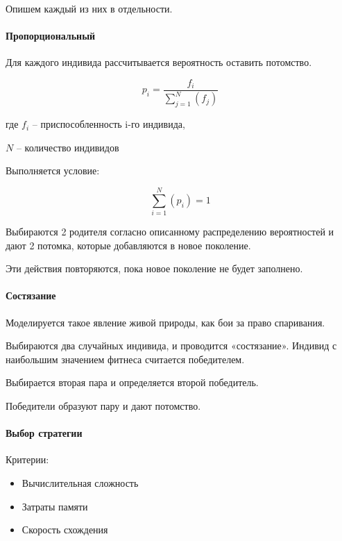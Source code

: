 Опишем каждый из них в отдельности.

\paragraph{Пропорциональный} \label{par:prop}

Для каждого индивида рассчитывается вероятность оставить потомство.

\begin{equation}
\label{equation:propF1}
p_i = \frac{f_i}{\sum_{j=1}^N(f_j)}
\end{equation}
\begin{ESKDexplanation}
\item[где ] $f_i$ -- приспособленность i-го индивида,
\item $N$ -- количество индивидов
\end{ESKDexplanation}

Выполняется условие:

\begin{equation}
\label{equation:propF1}
\sum_{i=1}^N(p_i) = 1
\end{equation}

Выбираются 2 родителя согласно описанному распределению вероятностей и дают 2 потомка, которые добавляются в новое поколение. 

Эти действия повторяются, пока новое поколение не будет заполнено.

\paragraph{Состязание}

Моделируется такое явление живой природы, как бои за право спаривания.

Выбираются два случайных индивида, и проводится «состязание». Индивид с наибольшим значением фитнеса считается победителем.

Выбирается вторая пара и определяется второй победитель.

Победители образуют пару и дают потомство.

\paragraph{Выбор стратегии}

Критерии:

\begin{itemize}
\item Вычислительная сложность
\item Затраты памяти
\item Скорость схождения
\end{itemize}

